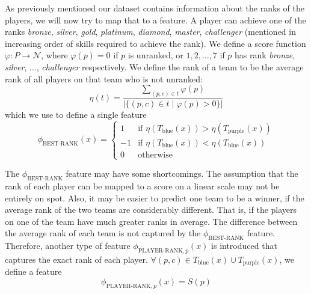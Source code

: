 As previously mentioned our dataset contains information about the ranks of the players, we will now try to map that to a feature. A player can achieve one of the ranks \textit{bronze}, \textit{silver}, \textit{gold}, \textit{platinum}, \textit{diamond}, \textit{master}, \textit{challenger} (mentioned in increasing order of skills required to achieve the rank).
We define a score function $\varphi : P \rightarrow \mathcal{N}$, where $\varphi(p) = 0$ if $p$ is unranked, or $1, 2, \dots, 7$ if $p$ has rank \textit{bronze}, \textit{silver}, $\dots$, \textit{challenger} respectively.
We define the rank of a team to be the average rank of all players on that team who is not unranked:
\begin{equation}\label{eq:eta}
\eta(t) = \frac{\sum\limits_{(p, c) \in t} \varphi(p)}{|\{(p, c) \in t \mid \varphi(p) > 0\}|}
\end{equation}
which we use to define a single feature
\begin{equation}\label{eq:bestrank}
\phi_\text{BEST-RANK}(x) = 
\begin{cases} 
  1 & \text{if } \eta(T_\text{blue}(x)) > \eta(T_\text{purple}(x))\\
  -1 & \text{if } \eta(T_\text{blue}(x)) < \eta(T_\text{blue}(x))\\
  0 & \text{otherwise} 
\end{cases}  
\end{equation}

The $\phi_\text{BEST-RANK}$ feature may have some shortcomings. The assumption that the rank of each player can be mapped to a score on a linear scale may not be entirely on spot.
Also, it may be easier to predict one team to be a winner, if the average rank of the two teams are considerably different. That is, if the players on one of the team have much greater ranks in average. The difference between the average rank of each team is not captured by the $\phi_\text{BEST-RANK}$ feature.
Therefore, another type of feature $\phi_{\text{PLAYER-RANK},p}(x)$ is introduced that captures the exact rank of each player.
$\forall(p, c) \in T_\text{blue}(x) \cup T_\text{purple}(x)$, we define a feature
\begin{equation}\label{eq:playerrank}
\phi_{\text{PLAYER-RANK},p}(x) = S(p)  
\end{equation}

